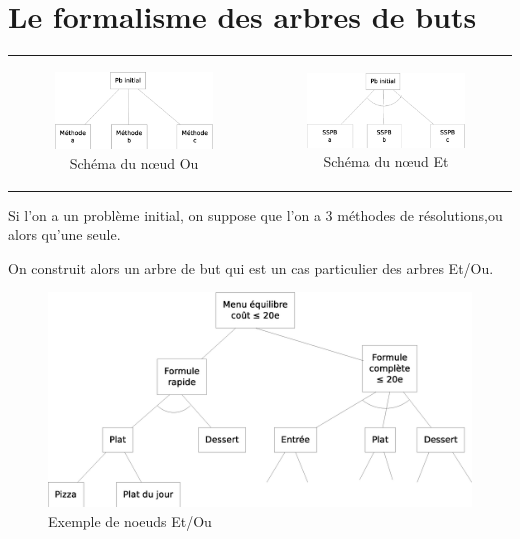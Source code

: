 \documentclass[12pt,a4paper,openany]{book}
\begin{document}
	\chapter{Le formalisme des arbres de buts}
	\begin{tabular}{cc}
		\begin{minipage}{0.5\textwidth}
		\begin{figure}[H]
			\centering
			\includegraphics[width=9cm]{diag3.eps}
			\caption{Schéma du nœud Ou}
		\end{figure}
		\end{minipage}
		&
		\begin{minipage}{0.5\textwidth}
		\begin{figure}[H]
			\centering
			\includegraphics[width=9cm]{diag4.eps}
			\caption{Schéma du nœud Et}
		\end{figure}
		\end{minipage}
	\end{tabular}

	Si l'on a un problème initial, on suppose que l'on a 3 méthodes de résolutions,ou alors qu'une seule.

	On construit alors un arbre de but qui est un cas particulier des arbres Et/Ou.

	\begin{exemple}
		\begin{figure}[H]
			\centering
			\includegraphics[width=13cm]{diag5.eps}
			\caption{Exemple de noeuds Et/Ou}
		\end{figure}
	\end{exemple}
\end{document}
